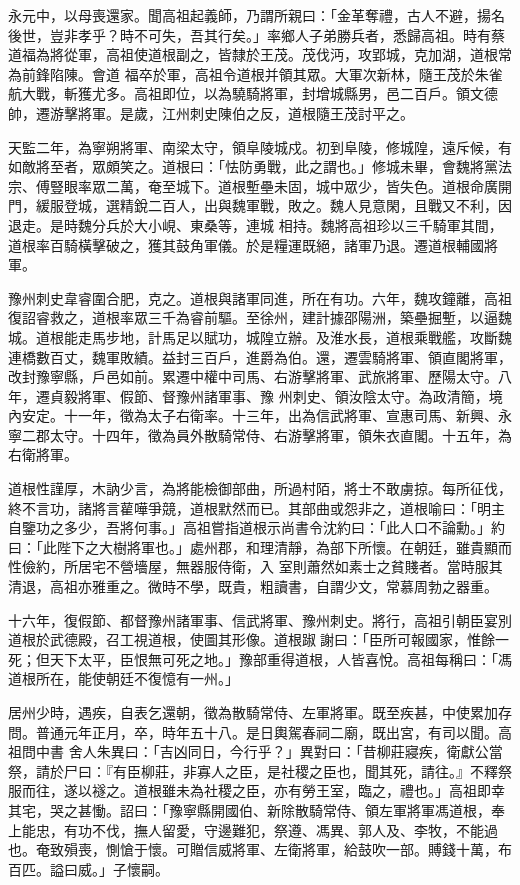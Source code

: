 \begin{pinyinscope}
 永元中，以母喪還家。聞高祖起義師，乃謂所親曰：「金革奪禮，古人不避，揚名後世，豈非孝乎？時不可失，吾其行矣。」率鄉人子弟勝兵者，悉歸高祖。時有蔡道福為將從軍，高祖使道根副之，皆隸於王茂。茂伐沔，攻郢城，克加湖，道根常為前鋒陷陳。會道
 福卒於軍，高祖令道根并領其眾。大軍次新林，隨王茂於朱雀航大戰，斬獲尤多。高祖即位，以為驍騎將軍，封增城縣男，邑二百戶。領文德帥，遷游擊將軍。是歲，江州刺史陳伯之反，道根隨王茂討平之。



 天監二年，為寧朔將軍、南梁太守，領阜陵城戍。初到阜陵，修城隍，遠斥候，有如敵將至者，眾頗笑之。道根曰：「怯防勇戰，此之謂也。」修城未畢，會魏將黨法宗、傅豎眼率眾二萬，奄至城下。道根塹壘未固，城中眾少，皆失色。道根命廣開門，緩服登城，選精銳二百人，出與魏軍戰，敗之。魏人見意閑，且戰又不利，因退走。是時魏分兵於大小峴、東桑等，連城
 相持。魏將高祖珍以三千騎軍其間，道根率百騎橫擊破之，獲其鼓角軍儀。於是糧運既絕，諸軍乃退。遷道根輔國將軍。



 豫州刺史韋睿圍合肥，克之。道根與諸軍同進，所在有功。六年，魏攻鐘離，高祖復詔睿救之，道根率眾三千為睿前驅。至徐州，建計據邵陽洲，築壘掘塹，以逼魏城。道根能走馬步地，計馬足以賦功，城隍立辦。及淮水長，道根乘戰艦，攻斷魏連橋數百丈，魏軍敗績。益封三百戶，進爵為伯。還，遷雲騎將軍、領直閣將軍，改封豫寧縣，戶邑如前。累遷中權中司馬、右游擊將軍、武旅將軍、歷陽太守。八年，遷貞毅將軍、假節、督豫州諸軍事、豫
 州刺史、領汝陰太守。為政清簡，境內安定。十一年，徵為太子右衛率。十三年，出為信武將軍、宣惠司馬、新興、永寧二郡太守。十四年，徵為員外散騎常侍、右游擊將軍，領朱衣直閣。十五年，為右衛將軍。



 道根性謹厚，木訥少言，為將能檢御部曲，所過村陌，將士不敢虜掠。每所征伐，終不言功，諸將言雚嘩爭競，道根默然而已。其部曲或怨非之，道根喻曰：「明主自鑒功之多少，吾將何事。」高祖嘗指道根示尚書令沈約曰：「此人口不論勳。」約曰：「此陛下之大樹將軍也。」處州郡，和理清靜，為部下所懷。在朝廷，雖貴顯而性儉約，所居宅不營墻屋，無器服侍衛，入
 室則蕭然如素士之貧賤者。當時服其清退，高祖亦雅重之。微時不學，既貴，粗讀書，自謂少文，常慕周勃之器重。



 十六年，復假節、都督豫州諸軍事、信武將軍、豫州刺史。將行，高祖引朝臣宴別道根於武德殿，召工視道根，使圖其形像。道根踧謝曰：「臣所可報國家，惟餘一死；但天下太平，臣恨無可死之地。」豫部重得道根，人皆喜悅。高祖每稱曰：「馮道根所在，能使朝廷不復憶有一州。」



 居州少時，遇疾，自表乞還朝，徵為散騎常侍、左軍將軍。既至疾甚，中使累加存問。普通元年正月，卒，時年五十八。是日輿駕春祠二廟，既出宮，有司以聞。高祖問中書
 舍人朱異曰：「吉凶同日，今行乎？」異對曰：「昔柳莊寢疾，衛獻公當祭，請於尸曰：『有臣柳莊，非寡人之臣，是社稷之臣也，聞其死，請往。』不釋祭服而往，遂以襚之。道根雖未為社稷之臣，亦有勞王室，臨之，禮也。」高祖即幸其宅，哭之甚慟。詔曰：「豫寧縣開國伯、新除散騎常侍、領左軍將軍馮道根，奉上能忠，有功不伐，撫人留愛，守邊難犯，祭遵、馮異、郭人及、李牧，不能過也。奄致殞喪，惻愴于懷。可贈信威將軍、左衛將軍，給鼓吹一部。賻錢十萬，布百匹。謚曰威。」子懷嗣。




\end{pinyinscope}

